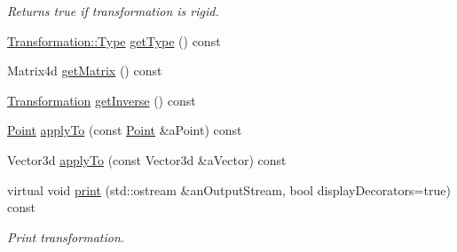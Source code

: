 \begin{DoxyCompactItemize}
\begin{DoxyCompactList}\small\item\em Returns true if transformation is rigid. \end{DoxyCompactList}\item 
\hyperlink{classostk_1_1math_1_1geom_1_1d3_1_1_transformation_a04794da018108a1e973dad364c32b4ec}{Transformation\+::\+Type} \hyperlink{classostk_1_1math_1_1geom_1_1d3_1_1_transformation_a8719d2d127c7e033561b2959c138b590}{get\+Type} () const
\item 
Matrix4d \hyperlink{classostk_1_1math_1_1geom_1_1d3_1_1_transformation_a992a684c74c25d7022d6815ebcc9aa63}{get\+Matrix} () const
\item 
\hyperlink{classostk_1_1math_1_1geom_1_1d3_1_1_transformation}{Transformation} \hyperlink{classostk_1_1math_1_1geom_1_1d3_1_1_transformation_a17f305513b284fb1fa27e657e2e94b1a}{get\+Inverse} () const
\item 
\hyperlink{classostk_1_1math_1_1geom_1_1d3_1_1objects_1_1_point}{Point} \hyperlink{classostk_1_1math_1_1geom_1_1d3_1_1_transformation_a03726747746fdfd6c4e788fd159f63fd}{apply\+To} (const \hyperlink{classostk_1_1math_1_1geom_1_1d3_1_1objects_1_1_point}{Point} \&a\+Point) const
\item 
Vector3d \hyperlink{classostk_1_1math_1_1geom_1_1d3_1_1_transformation_aa3c646bbeef48cb0cd60110a06eab446}{apply\+To} (const Vector3d \&a\+Vector) const
\item 
virtual void \hyperlink{classostk_1_1math_1_1geom_1_1d3_1_1_transformation_af1c84d46b72b57aef02beaf1fd42d87e}{print} (std\+::ostream \&an\+Output\+Stream, bool display\+Decorators=true) const
\begin{DoxyCompactList}\small\item\em Print transformation. \end{DoxyCompactList}\end{DoxyCompactItemize}
